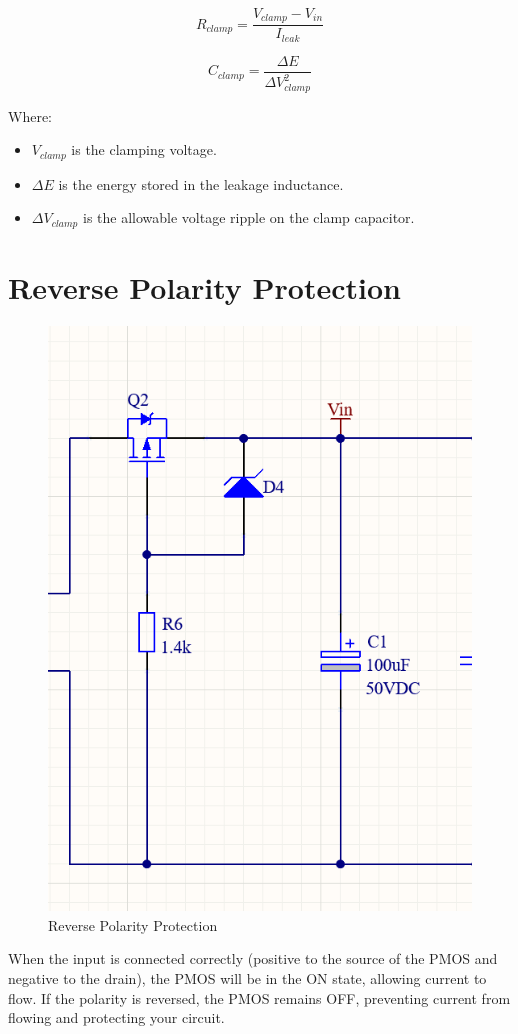 \documentclass{article}
\begin{document}
\[
R_{clamp} = \frac{V_{clamp} - V_{in}}{I_{leak}}
\]

\[
C_{clamp} = \frac{\Delta E}{\Delta V_{clamp}^2}
\]

Where:
\begin{itemize}
    \item $V_{clamp}$ is the clamping voltage.
    \item $\Delta E$ is the energy stored in the leakage inductance.
    \item $\Delta V_{clamp}$ is the allowable voltage ripple on the clamp capacitor.
\end{itemize}


\section*{Reverse Polarity Protection}
\begin{figure}[htbp]
    \centering
    \includegraphics[width=\textwidth]{RVP.png}
    \caption{Reverse Polarity Protection}
    \label{fig:RVP}
\end{figure}
When the input is connected correctly (positive to the source of the PMOS and negative to the drain), the PMOS will be in the ON state, allowing current to flow. If the polarity is reversed, the PMOS remains OFF, preventing current from flowing and protecting your circuit. 
\end{document}
